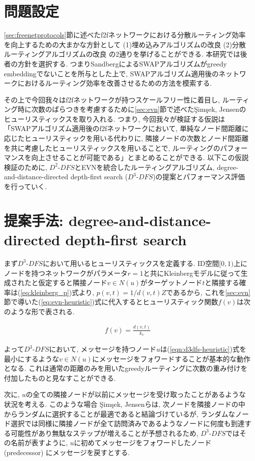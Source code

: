 \documentclass[dvipdfmx]{ampbt}
\begin{document}
\section{問題設定}
\ref{sec:freenetprotocols}節に述べた\acrshort{f2f}ネットワークにおける分散ルーティング効率を向上するための大まかな方針として (1)埋め込みアルゴリズムの改良 (2)分散ルーティングアルゴリズムの改良 の2通りを挙げることができる. 本研究では後者の方針を選択する. つまりSandbergによるSWAPアルゴリズムがgreedy embeddingでないことを所与とした上で, SWAPアルゴリズム適用後のネットワークにおけるルーティング効率を改善させるための方法を模索する.

その上で今回我々は\acrshort{f2f}ネットワークが持つスケールフリー性に着目し, ルーティング時に次数のばらつきを考慮するために\ref{sec:evn}節で述べた{\c{S}}im{\c{s}}ek, Jensenのヒューリスティックスを取り入れる. つまり, 今回我々が検証する仮説は「SWAPアルゴリズム適用後の\acrshort{f2f}ネットワークにおいて, 単純なノード間距離に応じたヒューリスティックを用いる代わりに, 隣接ノードの次数とノード間距離を共に考慮したヒューリスティックスを用いることで, ルーティングのパフォーマンスを向上させることが可能である」とまとめることができる. 以下この仮説検証のために, $D^2$-$DFS$とEVNを統合したルーティングアルゴリズム, degree-and-distance-directed depth-first search ($D^3$-$DFS$)の提案とパフォーマンス評価を行っていく.

\section{提案手法: degree-and-distance-directed depth-first search}
まず$D^3$-$DFS$において用いるヒューリスティックスを定義する. ID空間$[0,1)$上にノードを持つネットワークがパラメータ$r=1$と共にKleinbergモデルに従って生成されたと仮定すると隣接ノード$v \in N(u)$がターゲットノード$t$と隣接する確率は(\ref{eq:kleinberg_p})式より, $p(v,t) = 1/d(v,t)Z$であるから, これを\ref{sec:evn}節で導いた(\ref{eq:evn-heuristic})式に代入するとヒューリスティック関数$f(v)$は次のような形で表される.

\begin{eqnarray}
f(v) = \frac{d(v,t)}{k_v} \label{eqn:d3dfs-heuristic}
\end{eqnarray}

よって$D^3$-$DFS$において, メッセージを持つノード$u$は(\ref{eqn:d3dfs-heuristic})式を最小にするような$v \in N(u)$にメッセージをフォワードすることが基本的な動作となる. これは通常の距離のみを用いたgreedyルーティングに次数の重み付けを付加したものと見なすことができる. 

次に, $u$の全ての隣接ノードが以前にメッセージを受け取ったことがあるような状況を考える. このような場合 {\c{S}}im{\c{s}}ek, Jensenらは, 次ノードを隣接ノードの中からランダムに選択することが最適であると結論づけているが, ランダムなノード選択では同様に隣接ノードが全て訪問済みであるようなノードに何度も到達する可能性があり無駄なステップが増えることが予想されるため, $D^3$-$DFS$ではその名前が表すように, $u$に初めてメッセージをフォワードしたノード (predecessor) にメッセージを戻すとする.
\end{document}
